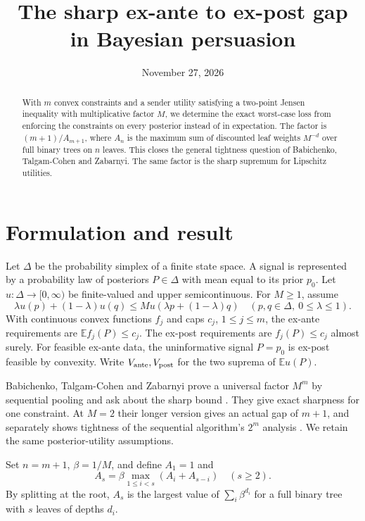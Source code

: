\documentclass[11pt,a4paper]{amsart}
\title{The sharp ex-ante to ex-post gap in Bayesian persuasion}
\date{November 27, 2026}
\begin{document}
\begin{abstract}
With \(m\) convex constraints and a sender utility satisfying a two-point Jensen inequality with multiplicative factor \(M\), we determine the exact worst-case loss from enforcing the constraints on every posterior instead of in expectation. The factor is \((m+1)/A_{m+1}\), where \(A_n\) is the maximum sum of discounted leaf weights \(M^{-d}\) over full binary trees on \(n\) leaves. This closes the general tightness question of Babichenko, Talgam-Cohen and Zabarnyi. The same factor is the sharp supremum for Lipschitz utilities.
\end{abstract}
\maketitle

\section{Formulation and result}

Let \(\Delta\) be the probability simplex of a finite state space. A signal is represented by a probability law of posteriors \(P\in\Delta\) with mean equal to its prior \(p_0\). Let \(u:\Delta\to[0,\infty)\) be finite-valued and upper semicontinuous. For \(M\ge1\), assume
\begin{equation}\label{eq:jensen}
 \lambda u(p)+(1-\lambda)u(q)
 \le M u(\lambda p+(1-\lambda)q)
 \quad (p,q\in\Delta,\ 0\le\lambda\le1).
\end{equation}
With continuous convex functions \(f_j\) and caps \(c_j\), \(1\le j\le m\), the ex-ante requirements are \(\mathbb E f_j(P)\le c_j\). The ex-post requirements are \(f_j(P)\le c_j\) almost surely. For feasible ex-ante data, the uninformative signal \(P=p_0\) is ex-post feasible by convexity. Write \(V_{\rm ante},V_{\rm post}\) for the two suprema of \(\mathbb E u(P)\).

Babichenko, Talgam-Cohen and Zabarnyi prove a universal factor \(M^m\) by sequential pooling and ask about the sharp bound \cite[Thm.~5.3]{btz}. They give exact sharpness for one constraint. At \(M=2\) their longer version gives an actual gap of \(m+1\), and separately shows tightness of the sequential algorithm's \(2^m\) analysis \cite[Prop.~5.5]{btzlong}. We retain the same posterior-utility assumptions.

Set \(n=m+1\), \(\beta=1/M\), and define \(A_1=1\) and
\[
 A_s=\beta\max_{1\le i<s}(A_i+A_{s-i})\quad(s\ge2).
\]
By splitting at the root, \(A_s\) is the largest value of \(\sum_i\beta^{d_i}\) for a full binary tree with \(s\) leaves of depths \(d_i\).
\end{document}
